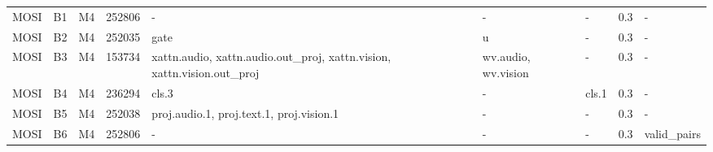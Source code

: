 \begin{table}
\begin{tabularx}{\textheight}{lllr>{\raggedright\arraybackslash}Xllrl}
MOSI & B1 & M4 & 252806 & - & - & - & 0.3 & - \\
MOSI & B2 & M4 & 252035 & gate & u & - & 0.3 & - \\
MOSI & B3 & M4 & 153734 & xattn.audio, xattn.audio.out\_\allowbreak{}proj, xattn.vision, xattn.vision.out\_\allowbreak{}proj & wv.audio, wv.vision & - & 0.3 & - \\
MOSI & B4 & M4 & 236294 & cls.3 & - & cls.1 & 0.3 & - \\
MOSI & B5 & M4 & 252038 & proj.audio.1, proj.text.1, proj.vision.1 & - & - & 0.3 & - \\
MOSI & B6 & M4 & 252806 & - & - & - & 0.3 & valid\_\allowbreak{}pairs \\
\bottomrule
\end{tabularx}
\end{table}
